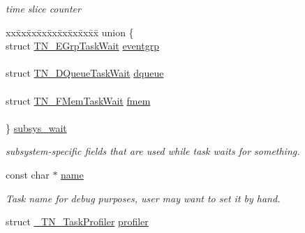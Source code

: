 \begin{DoxyCompactItemize}
\begin{DoxyCompactList}\small\item\em time slice counter \end{DoxyCompactList}\item 
\begin{tabbing}
xx\=xx\=xx\=xx\=xx\=xx\=xx\=xx\=xx\=\kill
union \{\\
\>struct \hyperlink{structTN__EGrpTaskWait}{TN\_EGrpTaskWait} \hyperlink{structTN__Task_a22c8cfe2e95d6f891aa568cafdb95936}{eventgrp}\\
\>\\
\>struct \hyperlink{structTN__DQueueTaskWait}{TN\_DQueueTaskWait} \hyperlink{structTN__Task_aa536e1eba96904c006d1e61efc520378}{dqueue}\\
\>\\
\>struct \hyperlink{structTN__FMemTaskWait}{TN\_FMemTaskWait} \hyperlink{structTN__Task_a31921e5384127319bffd5ae09debac1e}{fmem}\\
\>\\
\} \hyperlink{structTN__Task_ae6f4bd3d67e5499ef2c5fb7c72ec6276}{subsys\_wait}\\

\end{tabbing}\begin{DoxyCompactList}\small\item\em subsystem-\/specific fields that are used while task waits for something. \end{DoxyCompactList}\item 
\hypertarget{structTN__Task_aed03c90906ffe2dcbcc49d8badc74147}{const char $\ast$ \hyperlink{structTN__Task_aed03c90906ffe2dcbcc49d8badc74147}{name}}\label{structTN__Task_aed03c90906ffe2dcbcc49d8badc74147}

\begin{DoxyCompactList}\small\item\em Task name for debug purposes, user may want to set it by hand. \end{DoxyCompactList}\item 
\hypertarget{structTN__Task_a206bc3b05e1c660bb4ad9c032f1856b4}{struct \hyperlink{struct__TN__TaskProfiler}{\+\_\+\+T\+N\+\_\+\+Task\+Profiler} \hyperlink{structTN__Task_a206bc3b05e1c660bb4ad9c032f1856b4}{profiler}}\label{structTN__Task_a206bc3b05e1c660bb4ad9c032f1856b4}


\end{DoxyCompactItemize}
